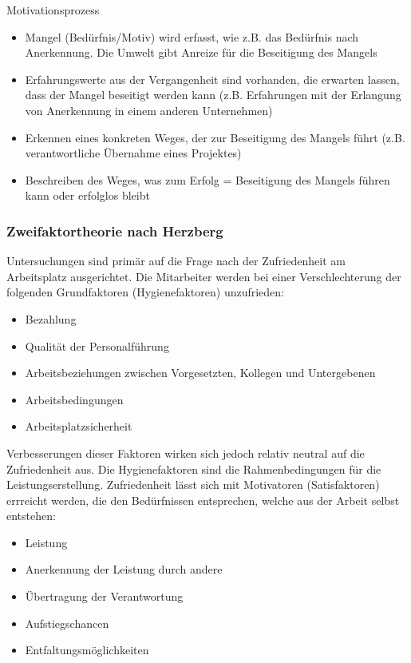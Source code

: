 Motivationsprozess
\begin{itemize}
	\item Mangel (Bedürfnis/Motiv) wird erfasst, wie z.B. das Bedürfnis nach Anerkennung. Die Umwelt gibt Anreize für die Beseitigung des Mangels
	\item Erfahrungswerte aus der Vergangenheit sind vorhanden, die erwarten lassen, dass der Mangel beseitigt werden kann (z.B. Erfahrungen mit der Erlangung von Anerkennung in einem anderen Unternehmen)
	\item Erkennen eines konkreten Weges, der zur Beseitigung des Mangels führt (z.B. verantwortliche Übernahme eines Projektes)
	\item Beschreiben des Weges, was zum Erfolg = Beseitigung des Mangels führen kann oder erfolglos bleibt
\end{itemize}

\subsubsection{Zweifaktortheorie nach Herzberg}

Untersuchungen sind primär auf die Frage nach der Zufriedenheit am Arbeitsplatz ausgerichtet. Die Mitarbeiter werden bei einer Verschlechterung der folgenden Grundfaktoren (Hygienefaktoren) unzufrieden:

\begin{itemize}
	\item Bezahlung
	\item Qualität der Personalführung
	\item Arbeitsbeziehungen zwischen Vorgesetzten, Kollegen und Untergebenen
	\item Arbeitsbedingungen
	\item Arbeitsplatzsicherheit
\end{itemize}

Verbesserungen dieser Faktoren wirken sich jedoch relativ neutral auf die Zufriedenheit aus. Die Hygienefaktoren sind die Rahmenbedingungen für die Leistungserstellung. Zufriedenheit lässt sich mit Motivatoren (Satisfaktoren) errreicht werden, die den Bedürfnissen entsprechen, welche aus der Arbeit selbst entstehen:

\begin{itemize}
	\item Leistung
	\item Anerkennung der Leistung durch andere
	\item Übertragung der Verantwortung
	\item Aufstiegschancen
	\item Entfaltungsmöglichkeiten
\end{itemize}

